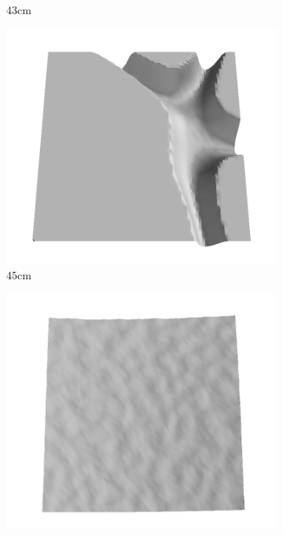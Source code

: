 \documentclass[../document.tex]{subfiles}
\begin{document}
\begin{figure}[htbp]
\begin{subfigure}[b]{0.19\textwidth}
    \caption{$43$cm}
    \end{subfigure}
    \begin{subfigure}[b]{0.19\textwidth}
    \includegraphics[width=\linewidth]{../img/5/train/all/45-patch-3d-majavi-22.png}
    \caption{$45$cm}
    \end{subfigure}
    \begin{subfigure}[b]{0.19\textwidth}
    \includegraphics[width=\linewidth]{../img/5/train/all/47-patch-3d-majavi-23.png}

\end{subfigure}
\end{figure}
\end{document}
